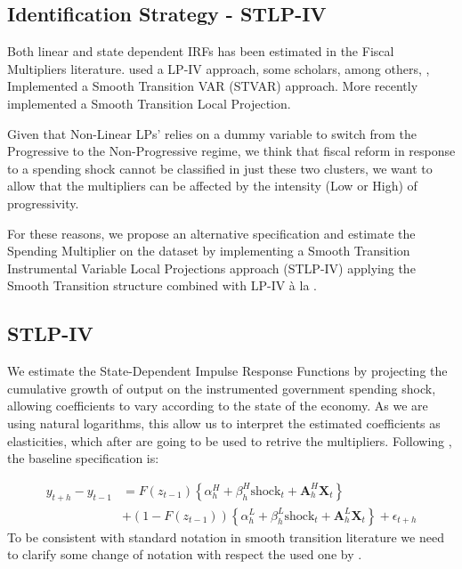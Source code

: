 \documentclass[12pt,letterpaper]{article}
\begin{document}
\subsection{Identification Strategy - STLP-IV}
Both linear and state dependent IRFs has been estimated in the Fiscal Multipliers literature.
\cite{RameyZubairy2018} used a LP-IV approach, 
some scholars, among others, \cite{Auerbach_Gorodn_2012_FiscalMultil,Auerbach_Gorodnichenko_2012_Measuring, CaggianoCastelnuovo_NonLinear}, Implemented a Smooth Transition VAR (STVAR) approach. More recently \cite{Ascari} implemented a Smooth Transition Local Projection.

Given that \cite{FN} Non-Linear LPs' relies on a dummy variable to switch from the Progressive to the Non-Progressive regime, we think that fiscal reform in response to a spending shock cannot be classified in just these two clusters, we want to allow that the multipliers can be affected by the intensity (Low or High) of progressivity.

For these reasons, we propose an alternative specification and 
estimate the Spending Multiplier on the \cite{FN} dataset by implementing a Smooth Transition Instrumental Variable Local Projections approach (STLP-IV) applying the \cite{GrangerTerasvirtaAnderson1993} Smooth Transition structure combined with LP-IV à la \cite{Jordà2005, JordàTaylo2025LP-IV}.

\subsection{STLP-IV}
We estimate the State-Dependent Impulse Response Functions by projecting the cumulative growth of output on the instrumented government spending shock, allowing coefficients to vary according to the state of the economy. As we are using natural logarithms, this allow us to interpret the estimated coefficients as elasticities, which after are going to be used to retrive the multipliers.
Following \cite{Ascari}, the baseline specification is:

\begin{align}
    y_{t+h} - y_{t-1} & = F(z_{t-1}) \left\{ \alpha^{H}_{h} + \beta^{H}_{h} \text{shock}_t + \bm{A}^{H}_{h} \bm{X}_t \right\} \nonumber \\
    & + (1 - F(z_{t-1})) \left\{ \alpha^{L}_{h} + \beta^{L}_{h} \text{shock}_t + \bm{A}^{L}_{h} \bm{X}_t \right\} + \epsilon_{t+h}
    \label{eq:STLP-IV_BasicModel}
\end{align}
To be consistent with standard notation in smooth transition literature we need to clarify some change of notation with respect the used one by \cite{FN}.
\end{document}
